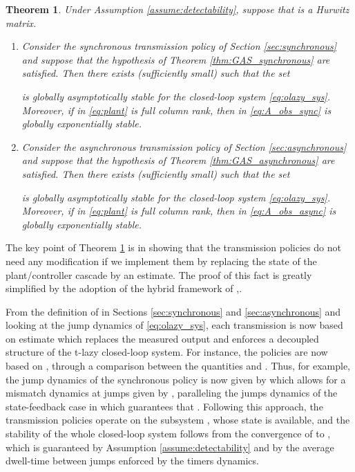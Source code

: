\documentclass[twocolumn]{autart}
\newtheorem{theorem}{Theorem}
\begin{document}
\begin{theorem}
\label{thm:GASoutput} 
 Under Assumption \ref{assume:detectability}, suppose that  is a Hurwitz matrix.
 \begin{enumerate}
  \item Consider the synchronous transmission policy of Section \ref{sec:synchronous}
  and suppose that the hypothesis of  Theorem \ref{thm:GAS_synchronous} are satisfied.
  Then there exists  (sufficiently small) such that the set
  
  is globally asymptotically stable for the closed-loop system \eqref{eq:olazy_sys}.
  Moreover, if  in \eqref{eq:plant} is full column rank, then  in \eqref{eq:A_obs_sync} is globally exponentially stable.
  \item Consider the asynchronous transmission policy of Section \ref{sec:asynchronous}
  and suppose that the hypothesis of  Theorem \ref{thm:GAS_asynchronous} are satisfied. 
  Then there exists  (sufficiently small) such that the set
  
  is globally asymptotically stable for the closed-loop system \eqref{eq:olazy_sys}.
  Moreover, if  in \eqref{eq:plant} is full column rank, then  in \eqref{eq:A_obs_async} is globally exponentially stable.
 \end{enumerate}
\end{theorem}

{
The key point of Theorem \ref{thm:GASoutput} is in showing that the transmission policies do
not need any modification if we implement them by replacing the state of the
plant/controller cascade by an estimate. The proof of this fact is greatly simplified by
the adoption of the hybrid framework of \cite{GoebelCSM09},\cite{Goebel06}.}

 From the definition of  in Sections
 \ref{sec:synchronous} and \ref{sec:asynchronous} and 
 looking at the jump dynamics of \eqref{eq:olazy_sys},
 each transmission is now based on estimate  which replaces 
 the measured output  and
 enforces a decoupled structure of the t-lazy closed-loop system. For instance, the policies 
 are now based on , through a comparison between the quantities  and . 
 Thus, for example, the jump dynamics of the synchronous policy is now 
 given by  which allows 
 for a mismatch dynamics at jumps given by 
 , paralleling the jumps dynamics of the 
 state-feedback case in which  guarantees that . Following this
 approach, the transmission policies operate on the subsystem , whose state is available, 
 and the stability of the whole closed-loop system follows from the convergence of  to ,
 which is guaranteed by Assumption \ref{assume:detectability} and by the average dwell-time 
 between jumps enforced by the timers dynamics.
\end{document}

